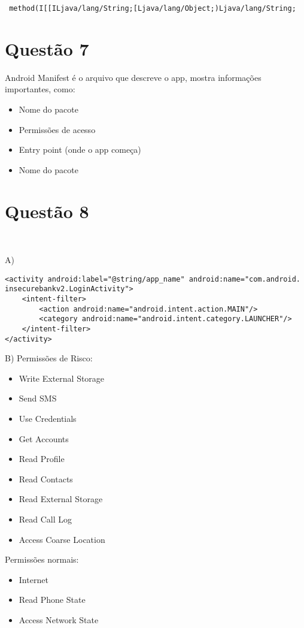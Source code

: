 \documentclass{article}
\renewcommand{\v}[1]{{}}
\begin{document}
\texttt{\
method(I[[\v]\v]ILjava/lang/String;[\v]Ljava/lang/Object;)Ljava/lang/String;
}

\section*{Questão 7}

Android Manifest é o arquivo que descreve o app,
mostra informações importantes, como:
\begin{itemize}
    \item Nome do pacote
    \item Permissões de acesso
    \item Entry point (onde o app começa)
    \item Nome do pacote
\end{itemize}

\section*{Questão 8}
\ 

A)
\begin{verbatim}
<activity android:label="@string/app_name" android:name="com.android.
insecurebankv2.LoginActivity">
    <intent-filter>
        <action android:name="android.intent.action.MAIN"/>
        <category android:name="android.intent.category.LAUNCHER"/>
    </intent-filter>
</activity>
\end{verbatim}

B)
Permissões de Risco:
\begin{itemize}
    \item Write External Storage
    \item Send SMS
    \item Use Credentials
    \item Get Accounts
    \item Read Profile
    \item Read Contacts
    \item Read External Storage
    \item Read Call Log
    \item Access Coarse Location
\end{itemize}

Permissões normais:
\begin{itemize}
    \item Internet
    \item Read Phone State
    \item Access Network State
\end{itemize}
\end{document}
